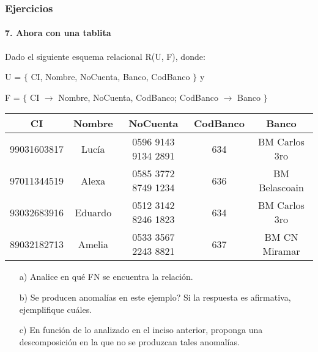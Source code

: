 \begin{frame}
    \frametitle{Ejercicios}
    \framesubtitle{7. Ahora con una tablita}

    Dado el siguiente esquema relacional R(U, F), donde:

    U = $\{$ CI, Nombre, NoCuenta, Banco, CodBanco $\}$ y

    F = $\{$ CI $\rightarrow$ Nombre, NoCuenta, CodBanco;
            CodBanco $\rightarrow$ Banco $\}$

    \begin{table}[!h]
        \small 
        \centering
        \begin{tabular}{|c|c|c|c|c|}
            \hline
            \textbf{CI} & \textbf{Nombre} & \textbf{NoCuenta} & \textbf{CodBanco} & \textbf{Banco}\\ \hline
            
            99031603817 & Luc\'ia & 0596 9143 9134 2891 & 634 & BM Carlos 3ro\\ \hline
            
            97011344519 & Alexa & 0585 3772 8749 1234 & 636 & BM Belascoain\\ \hline	
            
            93032683916 & Eduardo & 0512 3142 8246 1823 & 634 & BM Carlos 3ro\\ \hline	
            
            89032182713 & Amelia & 0533 3567 2243 8821 & 637 & BM CN Miramar\\ \hline	
        \end{tabular}
    \end{table}
        
    \begin{enumerate}
        \item[a)] Analice en qu\'e FN se encuentra la relaci\'on.
        
        \item[b)] \textquestiondown Se producen anomal\'ias en este ejemplo? Si la respuesta es afirmativa, ejemplifique cu\'ales.
        
        \item[c)] En funci\'on de lo analizado en el inciso anterior, proponga una descomposici\'on en la que no se produzcan tales anomal\'ias.
    \end{enumerate}

\end{frame}